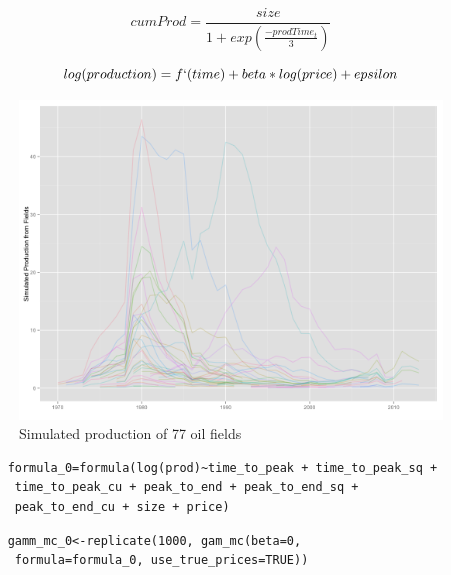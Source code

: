 \documentclass{beamer}
\begin{document}
\begin{frame}[plain]
	\begin{equation}
		cumProd=\frac{size}{1+exp(\frac{-prodTime_t}{3})}
		\label{cumProd_equation}
	\end{equation}
\end{frame}


\begin{frame}[plain]
	\begin{equation}
		log(production) = f`(time) + beta*log(price) + epsilon
	\end{equation}
\end{frame}

\begin{frame}[plain]
	\begin{figure}
		\includegraphics[width=1\textwidth]{figures/simulated_production.png}
		\caption{Simulated production of 77 oil fields}
		\label{simulated_production}	
	\end{figure}
\end{frame}


\small \begin{frame}
	\small \begin{verbatim}
	formula_0=formula(log(prod)~time_to_peak + time_to_peak_sq +
	 time_to_peak_cu + peak_to_end + peak_to_end_sq + 
	 peak_to_end_cu + size + price)
	\end{verbatim}
\end{frame}

\begin{frame}
	\small \begin{verbatim}
	gamm_mc_0<-replicate(1000, gam_mc(beta=0,
	 formula=formula_0, use_true_prices=TRUE))
	\end{verbatim}
\end{frame}
\end{document}

